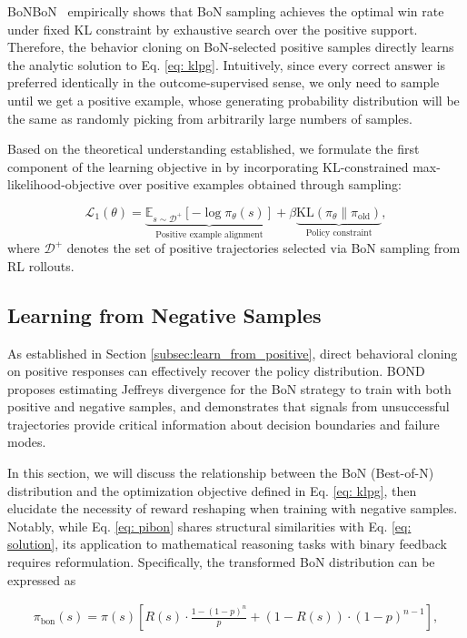 BoNBoN~\cite{gui2024bonbon} empirically shows that BoN sampling achieves the optimal win rate under fixed KL constraint by exhaustive search over the positive support. Therefore, the behavior cloning on BoN-selected positive samples directly learns the analytic solution to Eq. \ref{eq: klpg}. Intuitively, since every correct answer is preferred identically in the outcome-supervised sense, we only need to sample until we get a positive example, whose generating probability distribution will be the same as randomly picking from arbitrarily large numbers of samples. 


Based on the theoretical understanding established, we formulate the first component of the learning objective in \methodname{} by incorporating KL-constrained max-likelihood-objective over positive examples obtained through sampling:

\[
\mathcal{L}_1(\theta) = \underbrace{\mathbb{E}_{s \sim \mathcal{D}^+} \left[ -\log \pi_\theta(s) \right]}_{\text{Positive example alignment}} + \beta \underbrace{\text{KL}(\pi_\theta \parallel \pi_{\text{old}})}_{\text{Policy constraint}},
\]
where $\mathcal{D}^+$ denotes the set of positive trajectories selected via BoN sampling from RL rollouts. 


\subsection{Learning from Negative Samples}\label{subsec:learn_from_negative}
As established in Section \ref{subsec:learn_from_positive}, direct behavioral cloning on positive responses can effectively recover the policy distribution. BOND \cite{sessa2024bond} proposes estimating Jeffreys divergence \cite{jeffreys1946invariant} for the BoN strategy to train with both positive and negative samples, and demonstrates that signals from unsuccessful trajectories provide critical information about decision boundaries and failure modes.

In this section, we will discuss the relationship between the BoN (Best-of-N) distribution and the optimization objective defined in Eq. \ref{eq: klpg}, then elucidate the necessity of reward reshaping when training with negative samples.
Notably, while Eq. \ref{eq: pibon} shares structural similarities with Eq. \ref{eq: solution}, its application to mathematical reasoning tasks with binary feedback requires reformulation. Specifically, the transformed BoN distribution can be expressed as

\begin{align}\label{eq. pbon}
\pi_{\text{bon}}(s) = \pi(s) \left[ R(s) \cdot \frac{1 - \left(1 - p\right)^n}{p} + \left(1 - R(s)\right) \cdot \left(1 - p\right)^{n-1} \right],
\end{align}

